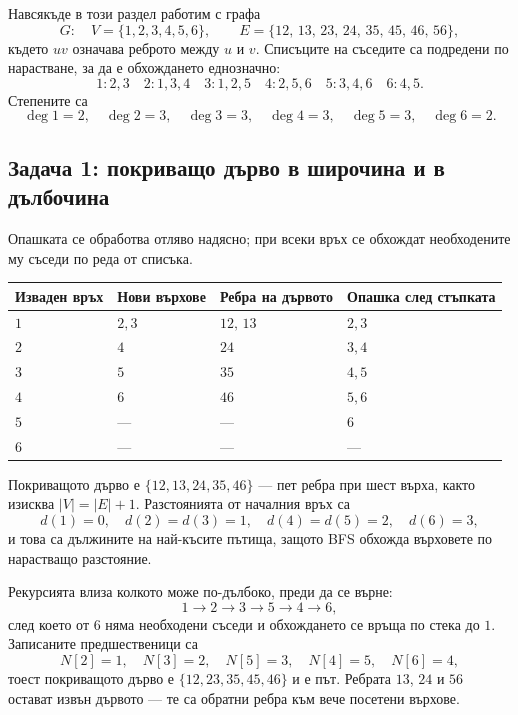 Навсякъде в този раздел работим с графа
\[
G:\quad V=\{1,2,3,4,5,6\},\qquad
E=\{12,\,13,\,23,\,24,\,35,\,45,\,46,\,56\},
\]
където $uv$ означава реброто между $u$ и $v$. Списъците на съседите са подредени
по нарастване, за да е обхождането еднозначно:
\[
1:2,3\quad 2:1,3,4\quad 3:1,2,5\quad 4:2,5,6\quad 5:3,4,6\quad 6:4,5 .
\]
Степените са
\[
\deg 1=2,\quad \deg 2=3,\quad \deg 3=3,\quad
\deg 4=3,\quad \deg 5=3,\quad \deg 6=2 .
\]

\subsection{Задача 1: покриващо дърво в широчина и в дълбочина}\label{s:3.7.1}

\begin{example}
Опашката се обработва отляво надясно; при всеки връх се обхождат необходените му
съседи по реда от списъка.

\begin{center}
\begin{tabular}{llll}
\toprule
Изваден връх & Нови върхове & Ребра на дървото & Опашка след стъпката\\
\midrule
$1$ & $2,3$ & $12,\,13$ & $2,3$\\
$2$ & $4$   & $24$      & $3,4$\\
$3$ & $5$   & $35$      & $4,5$\\
$4$ & $6$   & $46$      & $5,6$\\
$5$ & ---   & ---       & $6$\\
$6$ & ---   & ---       & ---\\
\bottomrule
\end{tabular}
\end{center}

Покриващото дърво е $\{12,13,24,35,46\}$ --- пет ребра при шест върха, както
изисква $|V|=|E|+1$. Разстоянията от началния връх са
\[
d(1)=0,\quad d(2)=d(3)=1,\quad d(4)=d(5)=2,\quad d(6)=3,
\]
и това са дължините на най-късите пътища, защото BFS обхожда върховете по
нарастващо разстояние.
\end{example}

\begin{example}
Рекурсията влиза колкото може по-дълбоко, преди да се върне:
\[
1\to 2\to 3\to 5\to 4\to 6,
\]
след което от $6$ няма необходени съседи и обхождането се връща по стека до $1$.
Записаните предшественици са
\[
N[2]=1,\quad N[3]=2,\quad N[5]=3,\quad N[4]=5,\quad N[6]=4,
\]
тоест покриващото дърво е $\{12,23,35,45,46\}$ и е път. Ребрата $13$, $24$ и
$56$ остават извън дървото --- те са обратни ребра към вече посетени върхове.
\end{example}

